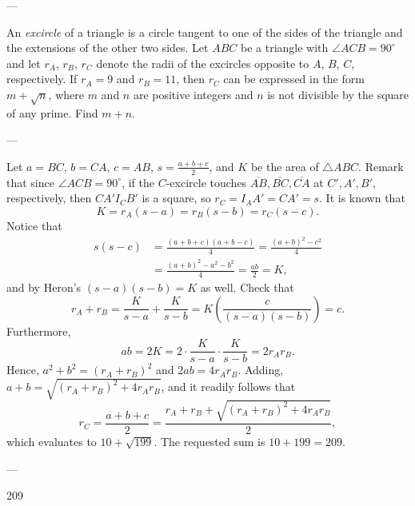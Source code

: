 
---

An \emph{excircle} of a triangle is a circle tangent to one of the sides of the triangle and the extensions of the other two sides. Let $ABC$ be a triangle with $\angle ACB=90^\circ$ and let $r_A$, $r_B$, $r_C$ denote the radii of the excircles opposite to $A$, $B$, $C$, respectively. If $r_A=9$ and $r_B=11$, then $r_C$ can be expressed in the form $m+\sqrt{n}$, where $m$ and $n$ are positive integers and $n$ is not divisible by the square of any prime. Find $m+n$. 

---

Let $a=BC$, $b=CA$, $c=AB$, $s=\tfrac{a+b+c}2$, and $K$ be the area of $\triangle ABC$. Remark that since $\angle ACB=90^\circ$, if the $C$-excircle touches $\overline{AB},\overline{BC},\overline{CA}$ at $C',A',B'$, respectively, then $CA'I_CB'$ is a square, so $r_C=I_AA'=CA'=s$. It is known that \[K=r_A(s-a)=r_B(s-b)=r_C(s-c).\]
Notice that
\begin{align*}
    s(s-c)&=\frac{(a+b+c)(a+b-c)}4=\frac{(a+b)^2-c^2}4\\ &=\frac{(a+b)^2-a^2-b^2}4=\frac{ab}2=K,
\end{align*}
and by Heron's $(s-a)(s-b)=K$ as well. Check that \[r_A+r_B=\frac K{s-a}+\frac K{s-b}=K\left(\frac c{(s-a)(s-b)}\right)=c.\]
Furthermore, \[ab=2K=2\cdot\frac K{s-a}\cdot\frac K{s-b}=2r_Ar_B.\]
Hence, $a^2+b^2=(r_A+r_B)^2$ and $2ab=4r_Ar_B$. Adding, $a+b=\sqrt{(r_A+r_B)^2+4r_Ar_B}$, and it readily follows that \[r_C=\frac{a+b+c}2=\frac{r_A+r_B+\sqrt{(r_A+r_B)^2+4r_Ar_B}}2,\]
which evaluates to $10+\sqrt{199}$. The requested sum is $10+199=209$.

---

209
